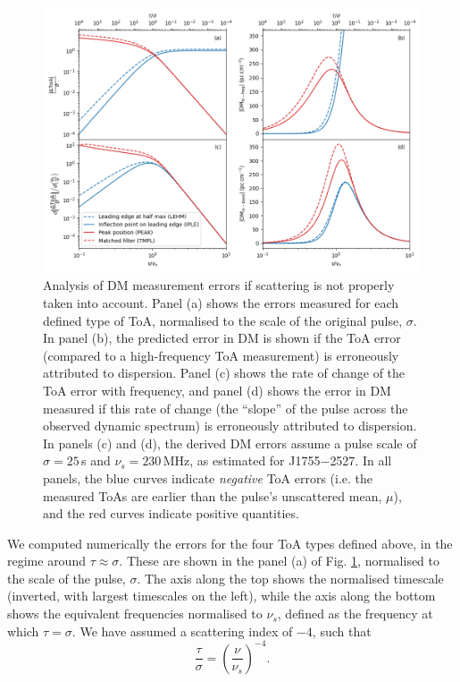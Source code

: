 \documentclass[fleqn,usenatbib]{mnras}
\newcommand{\src}{J1755$-$2527}
\begin{document}
\begin{figure}[th]
    \centering
    \includegraphics[width=0.98\linewidth]{scattering_DM.png}
    \caption{Analysis of DM measurement errors if scattering is not properly taken into account. Panel (a) shows the errors measured for each defined type of ToA, normalised to the scale of the original pulse, $\sigma$. In panel (b), the predicted error in DM is shown if the ToA error (compared to a high-frequency ToA measurement) is erroneously attributed to dispersion. Panel (c) shows the rate of change of the ToA error with frequency, and panel (d) shows the error in DM measured if this rate of change (the ``slope'' of the pulse across the observed dynamic spectrum) is erroneously attributed to dispersion. In panels (c) and (d), the derived DM errors assume a pulse scale of $\sigma = 25\,$s and $\nu_s = 230\,$MHz, as estimated for \src{}. In all panels, the blue curves indicate \emph{negative} ToA errors (i.e. the measured ToAs are earlier than the pulse's unscattered mean, $\mu$), and the red curves indicate positive quantities.}
    \label{fig:scattering_DM}
\end{figure}

We computed numerically \citep[using SciPy's \texttt{root} function;][]{2020NatMe..17..261V} the errors for the four ToA types defined above, in the regime around $\tau \approx \sigma$.
These are shown in the panel (a) of Fig. \ref{fig:scattering_DM}, normalised to the scale of the pulse, $\sigma$.
The axis along the top shows the normalised timescale (inverted, with largest timescales on the left), while the axis along the bottom shows the equivalent frequencies normalised to $\nu_s$, defined as the frequency at which $\tau = \sigma$.
We have assumed a scattering index of $-4$, such that
\begin{equation}
    \frac{\tau}{\sigma} = \left(\frac{\nu}{\nu_s}\right)^{-4}.
\end{equation}
\end{document}
